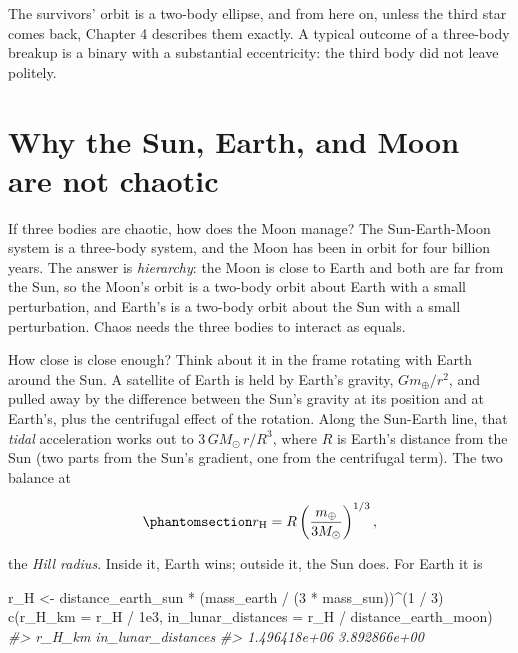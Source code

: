 \documentclass[
  10.5pt,
  letterpaper,
]{scrbook}
\newenvironment{Shaded}{\begin{snugshade}}{\end{snugshade}}
\newcommand{\AttributeTok}[1]{\textcolor[rgb]{0.00,0.00,0.00}{#1}}
\newcommand{\CommentTok}[1]{\textcolor[rgb]{0.00,0.00,0.00}{\textit{#1}}}
\newcommand{\DecValTok}[1]{\textcolor[rgb]{0.00,0.00,0.00}{#1}}
\newcommand{\FloatTok}[1]{\textcolor[rgb]{0.00,0.00,0.00}{#1}}
\newcommand{\FunctionTok}[1]{\textcolor[rgb]{0.00,0.00,0.00}{#1}}
\newcommand{\NormalTok}[1]{\textcolor[rgb]{0.00,0.00,0.00}{#1}}
\newcommand{\OtherTok}[1]{\textcolor[rgb]{0.00,0.00,0.00}{#1}}
\newcommand{\SpecialCharTok}[1]{\textcolor[rgb]{0.00,0.00,0.00}{#1}}
\theoremstyle{plain}
\theoremstyle{remark}
\begin{document}
The survivors' orbit is a two-body ellipse, and from here on, unless the
third star comes back, Chapter 4 describes them exactly. A typical
outcome of a three-body breakup is a binary with a substantial
eccentricity: the third body did not leave politely.

\section{Why the Sun, Earth, and Moon are not
chaotic}\label{why-the-sun-earth-and-moon-are-not-chaotic}

If three bodies are chaotic, how does the Moon manage? The
Sun-Earth-Moon system is a three-body system, and the Moon has been in
orbit for four billion years. The answer is \emph{hierarchy}: the Moon
is close to Earth and both are far from the Sun, so the Moon's orbit is
a two-body orbit about Earth with a small perturbation, and Earth's is a
two-body orbit about the Sun with a small perturbation. Chaos needs the
three bodies to interact as equals.

How close is close enough? Think about it in the frame rotating with
Earth around the Sun. A satellite of Earth is held by Earth's gravity,
\(G m_\oplus / r^2\), and pulled away by the difference between the
Sun's gravity at its position and at Earth's, plus the centrifugal
effect of the rotation. Along the Sun-Earth line, that \emph{tidal}
acceleration works out to \(3\,G M_\odot\, r / R^3\), where \(R\) is
Earth's distance from the Sun (two parts from the Sun's gradient, one
from the centrifugal term). The two balance at

\begin{equation}\protect\phantomsection\label{eq-hill}{
r_{\mathrm{H}} = R\left(\frac{m_\oplus}{3 M_\odot}\right)^{1/3},
}\end{equation}

the \emph{Hill radius}. Inside it, Earth wins; outside it, the Sun does.
For Earth it is

\begin{Shaded}
\begin{Highlighting}[]
\NormalTok{r\_H }\OtherTok{\textless{}{-}}\NormalTok{ distance\_earth\_sun }\SpecialCharTok{*}\NormalTok{ (mass\_earth }\SpecialCharTok{/}\NormalTok{ (}\DecValTok{3} \SpecialCharTok{*}\NormalTok{ mass\_sun))}\SpecialCharTok{\^{}}\NormalTok{(}\DecValTok{1} \SpecialCharTok{/} \DecValTok{3}\NormalTok{)}
\FunctionTok{c}\NormalTok{(}\AttributeTok{r\_H\_km =}\NormalTok{ r\_H }\SpecialCharTok{/} \FloatTok{1e3}\NormalTok{, }\AttributeTok{in\_lunar\_distances =}\NormalTok{ r\_H }\SpecialCharTok{/}\NormalTok{ distance\_earth\_moon)}
\CommentTok{\#\textgreater{}             r\_H\_km in\_lunar\_distances }
\CommentTok{\#\textgreater{}       1.496418e+06       3.892866e+00}
\end{Highlighting}
\end{Shaded}
\end{document}
